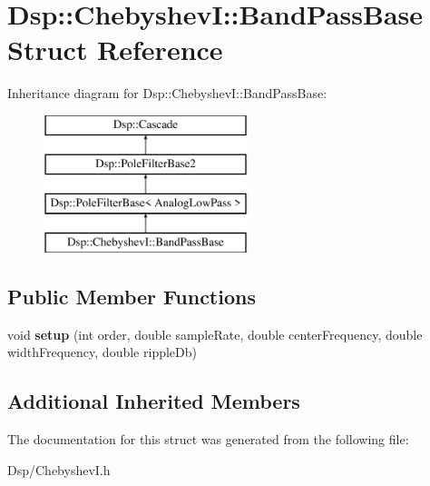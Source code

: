 \hypertarget{structDsp_1_1ChebyshevI_1_1BandPassBase}{\section{Dsp\-:\-:Chebyshev\-I\-:\-:Band\-Pass\-Base Struct Reference}
\label{structDsp_1_1ChebyshevI_1_1BandPassBase}
}
Inheritance diagram for Dsp\-:\-:Chebyshev\-I\-:\-:Band\-Pass\-Base\-:\begin{figure}[H]
\begin{center}
\leavevmode
\includegraphics[height=4.000000cm]{structDsp_1_1ChebyshevI_1_1BandPassBase}
\end{center}
\end{figure}
\subsection*{Public Member Functions}
\begin{DoxyCompactItemize}
\item 
\hypertarget{structDsp_1_1ChebyshevI_1_1BandPassBase_ae7a77265d9f89c9ac4221ac39dec395c}{void {\bfseries setup} (int order, double sample\-Rate, double center\-Frequency, double width\-Frequency, double ripple\-Db)}\label{structDsp_1_1ChebyshevI_1_1BandPassBase_ae7a77265d9f89c9ac4221ac39dec395c}

\end{DoxyCompactItemize}
\subsection*{Additional Inherited Members}


The documentation for this struct was generated from the following file\-:\begin{DoxyCompactItemize}
\item 
Dsp/Chebyshev\-I.\-h\end{DoxyCompactItemize}
